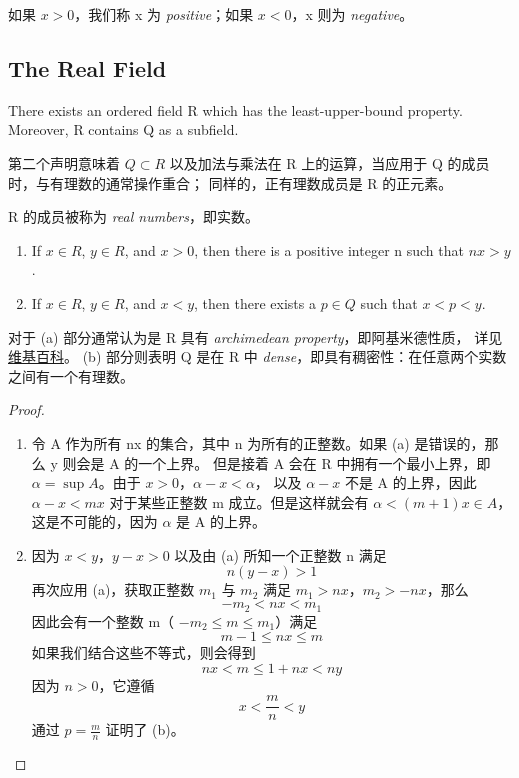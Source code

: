 \documentclass[../poma-notes.tex]{subfiles}
\begin{document}
如果 $x>0$，我们称 x 为 \textit{positive}；如果 $x<0$，x 则为 \textit{negative}。

\subsection*{The Real Field}

\setcounter{poma}{18}
\begin{theorem}
	There exists an ordered field R which has the least-upper-bound property.
	Moreover, R contains Q as a subfield.
\end{theorem}

第二个声明意味着 $Q \subset R$ 以及加法与乘法在 R 上的运算，当应用于 Q 的成员时，与有理数的通常操作重合；
同样的，正有理数成员是 R 的正元素。

R 的成员被称为 \textit{real numbers}，即实数。


\begin{theorem}
	\leavevmode
	\begin{enumerate}[label=(\alph*)]
		\item If $x \in R$, $y \in R$, and $x>0$, then there is a positive integer n such that $nx>y$.
		\item If $x \in R$, $y \in R$, and $x<y$, then there exists a $p \in Q$ such that $x<p<y$.
	\end{enumerate}
\end{theorem}

对于 (a) 部分通常认为是 R 具有 \textit{archimedean property}，即阿基米德性质，
详见\href{https://en.wikipedia.org/wiki/Archimedean_property}{维基百科}。
(b) 部分则表明 Q 是在 R 中 \textit{dense}，即具有稠密性：在任意两个实数之间有一个有理数。

\begin{proof}
	\begin{enumerate}[label=(\alph*)]
		\item 令 A 作为所有 nx 的集合，其中 n 为所有的正整数。如果 (a) 是错误的，那么 y 则会是 A 的一个上界。
		      但是接着 A 会在 R 中拥有一个最小上界，即 $\alpha  = \sup A$。由于 $x>0$，$\alpha - x < \alpha$，
		      以及 $\alpha - x$ 不是 A 的上界，因此 $\alpha - x < mx$ 对于某些正整数 m 成立。但是这样就会有
		      $\alpha < (m+1)x \in A$，这是不可能的，因为 $\alpha$ 是 A 的上界。
		\item 因为 $x<y$，$y-x>0$ 以及由 (a) 所知一个正整数 n 满足
		      \[n(y-x)>1\]
		      再次应用 (a)，获取正整数 $m_1$ 与 $m_2$ 满足 $m_1 > nx$，$m_2 > -nx$，那么
		      \[-m_2 < nx < m_1\]
		      因此会有一个整数 m（ $-m_2 \le m \le m_1$）满足
		      \[m-1 \le nx \le m\]
		      如果我们结合这些不等式，则会得到
		      \[nx < m \le 1 + nx < ny\]
		      因为 $n>0$，它遵循
		      \[x < \frac{m}{n} < y\]
		      通过 $p=\frac{m}{n}$ 证明了 (b)。
	\end{enumerate}
\end{proof}
\end{document}
